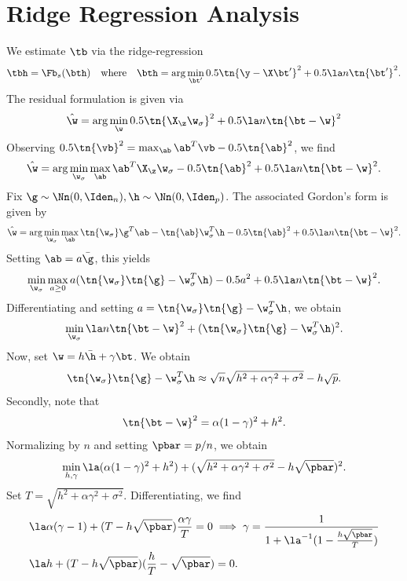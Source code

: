 
\newpage
\section{Ridge Regression Analysis}
We estimate $\tb$ via the ridge-regression
\begin{align}
\tbh=\Fb_s(\bth)\quad\text{where}\quad \bth=\arg\min_{\bt'} 0.5\tn{\y-\X\bt'}^2+0.5\la n \tn{\bt'}^2.\label{optim me3}
\end{align}
The residual formulation is given via
\[
\hat{\w}=\arg\min_{\w} 0.5\tn{\X_\z\w_\sigma}^2+0.5\la n \tn{\bt-\w}^2
\]
Observing $0.5\tn{\vb}^2=\max_{\ab} \ab^T\vb-0.5\tn{\ab}^2$, we find
\[
\hat{\w}=\arg\min_{\w_{\sigma}} \max_{\ab} \ab^T\X_\z\w_\sigma-0.5\tn{\ab}^2+0.5\la n \tn{\bt-\w}^2.
\]
Fix $\g\sim\Nn(0,\Iden_n),\h\sim\Nn(0,\Iden_p)$. The associated Gordon's form is given by
\[
\hat{\w}=\arg\min_{\w_{\sigma}} \max_{\ab}\tn{\w_\sigma}\g^T\ab- \tn{\ab}\w_\sigma^T\h-0.5\tn{\ab}^2+0.5\la n \tn{\bt-\w}^2.
\]
Setting $\ab=a\bar{\g}$, this yields 
\[
\min_{\w_{\sigma}} \max_{a\geq 0}a(\tn{\w_\sigma}\tn{\g}- \w_\sigma^T\h)-0.5a^2+0.5\la n \tn{\bt-\w}^2.
\]
Differentiating and setting $a=\tn{\w_\sigma}\tn{\g}- \w_\sigma^T\h$, we obtain 
\[
\min_{\w_{\sigma}} \la n \tn{\bt-\w}^2+(\tn{\w_\sigma}\tn{\g}- \w_\sigma^T\h)^2.
\]
Now, set $\w=h\bar{\h}+\gamma \bt$. We obtain
\[
\tn{\w_\sigma}\tn{\g}- \w_\sigma^T\h\approx \sqrt{n}\sqrt{h^2+\alpha\gamma^2+\sigma^2}-h\sqrt{p}.
\]
Secondly, note that
\[
 \tn{\bt-\w}^2=\alpha(1-\gamma)^2+h^2.
\]
Normalizing by $n$ and setting $\pbar=p/n$, we obtain
\begin{align}\label{eq:min_hgamma_reg}
\min_{h,\gamma} \la (\alpha(1-\gamma)^2+h^2)+(\sqrt{h^2+\alpha\gamma^2+\sigma^2}-h\sqrt{\pbar})^2.
\end{align}
Set $T=\sqrt{h^2+\alpha\gamma^2+\sigma^2}$. Differentiating, we find
\begin{align}
&\la \alpha (\gamma-1)+(T-h\sqrt{\pbar})\frac{\alpha\gamma}{T}=0\implies \gamma=\frac{1}{1+\la^{-1}(1-\frac{h\sqrt{\pbar}}{T})}\label{eq:reg1}\\
&\la h+(T-h\sqrt{\pbar})(\frac{h}{T}-\sqrt{\pbar})=0.\label{eq:reg2}
\end{align}


